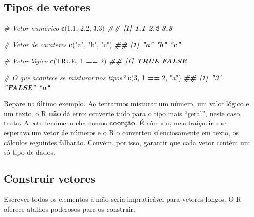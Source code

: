 \documentclass[
  portuguese,
  11pt,
  openany]{book}
\newenvironment{Shaded}{\begin{snugshade}}{\end{snugshade}}
\newcommand{\CommentTok}[1]{\textcolor[rgb]{0.56,0.35,0.01}{\textit{#1}}}
\newcommand{\ConstantTok}[1]{\textcolor[rgb]{0.56,0.35,0.01}{#1}}
\newcommand{\DecValTok}[1]{\textcolor[rgb]{0.00,0.00,0.81}{#1}}
\newcommand{\DocumentationTok}[1]{\textcolor[rgb]{0.56,0.35,0.01}{\textbf{\textit{#1}}}}
\newcommand{\FloatTok}[1]{\textcolor[rgb]{0.00,0.00,0.81}{#1}}
\newcommand{\FunctionTok}[1]{\textcolor[rgb]{0.13,0.29,0.53}{\textbf{#1}}}
\newcommand{\NormalTok}[1]{#1}
\newcommand{\SpecialCharTok}[1]{\textcolor[rgb]{0.81,0.36,0.00}{\textbf{#1}}}
\newcommand{\StringTok}[1]{\textcolor[rgb]{0.31,0.60,0.02}{#1}}
\begin{document}
\subsection{Tipos de vetores}\label{tipos-de-vetores}

\begin{Shaded}
\begin{Highlighting}[]
\CommentTok{\# Vetor numérico}
\FunctionTok{c}\NormalTok{(}\FloatTok{1.1}\NormalTok{, }\FloatTok{2.2}\NormalTok{, }\FloatTok{3.3}\NormalTok{)}
\DocumentationTok{\#\# [1] 1.1 2.2 3.3}

\CommentTok{\# Vetor de carateres}
\FunctionTok{c}\NormalTok{(}\StringTok{"a"}\NormalTok{, }\StringTok{"b"}\NormalTok{, }\StringTok{"c"}\NormalTok{)}
\DocumentationTok{\#\# [1] "a" "b" "c"}

\CommentTok{\# Vetor lógico}
\FunctionTok{c}\NormalTok{(}\ConstantTok{TRUE}\NormalTok{, }\DecValTok{1} \SpecialCharTok{==} \DecValTok{2}\NormalTok{)}
\DocumentationTok{\#\# [1]  TRUE FALSE}

\CommentTok{\# O que acontece se misturarmos tipos?}
\FunctionTok{c}\NormalTok{(}\DecValTok{3}\NormalTok{, }\DecValTok{1} \SpecialCharTok{==} \DecValTok{2}\NormalTok{, }\StringTok{"a"}\NormalTok{)}
\DocumentationTok{\#\# [1] "3"     "FALSE" "a"}
\end{Highlighting}
\end{Shaded}

Repare no último exemplo. Ao tentarmos misturar um número, um valor lógico e um
texto, o R \textbf{não} dá erro: converte tudo para o tipo mais ``geral'', neste caso,
texto. A este fenómeno chamamos \textbf{coerção}. É cómodo, mas traiçoeiro: se
esperava um vetor de números e o R o converteu silenciosamente em texto, os
cálculos seguintes falharão. Convém, por isso, garantir que cada vetor contém um
só tipo de dados.

\subsection{Construir vetores}\label{construir-vetores}

Escrever todos os elementos à mão seria impraticável para vetores longos. O R
oferece atalhos poderosos para os construir:
\end{document}
